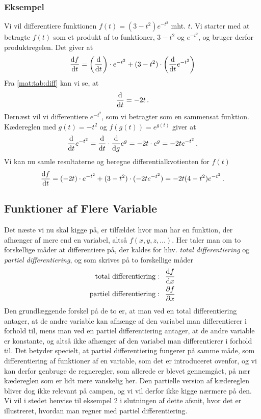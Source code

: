 \subsubsection{Eksempel}
Vi vil differentiere funktionen $f(t) = (3 - t^2) e^{-t^2}$
mht. $t$. Vi starter med at betragte $f(t)$ som et produkt af to
funktioner, $3-t^2$ og $e^{-t^2}$, og bruger derfor produktregelen. Det giver at
\begin{equation*}
    \dv{f}{t} = \left(\dv{}{t} (3-t^2)\right) \cdot e^{-t^2} + (3-t^2) \cdot \left(\dv{}{t} e^{-t^2}\right)
\end{equation*}
Fra \cref{mat:tab:diff} kan vi se, at
\begin{equation*}
    \dv{}{t} (3-t^2) = -2t \, .
\end{equation*}
Dernæst vil vi differentiere $e^{-t^2}$, som vi betragter som en
sammensat funktion. Kædereglen med $g(t) = -t^2$ og $f(g(t)) = e^{g(t)}$
giver at
\begin{equation*}
    \dv{}{t} e^{-t^2} = \dv{}{t} (-t^2) \cdot \dv{}{g} e^g
    = -2t \cdot e^g
    = -2t e^{-t^2} \, .
\end{equation*}
Vi kan nu samle resultaterne og beregne differentialkvotienten for $f(t)$
\begin{equation*}
    \dv{f}{t} = (-2t) \cdot e^{-t^2} + (3-t^2) \cdot (-2t e^{-t^2}) = -2t(4 - t^2) e^{-t^2} \, .
\end{equation*}

\subsection{Funktioner af Flere Variable}
Det næste vi nu skal kigge på, er tilfældet hvor man har en funktion, der afhænger af mere end en variabel, altså $f(x,y,z,\ldots)$. Her taler man om to forskellige måder at differentiere på, der kaldes for hhv. \emph{total differentiering} og \emph{partiel differentiering}, og som skrives på to forskellige måder
\begin{align*}
    \text{total differentiering}&: \enspace \dv{f}{x} \\ \text{partiel differentiering}&: \enspace \pdv{f}{x}
\end{align*} 
Den grundlæggende forskel på de to er, at man ved en total differentiering antager, at de andre variable kan afhænge af den variabel man differentierer i forhold til, mens man ved en partiel differentiering antager, at de andre variable er konstante, og altså ikke afhænger af den variabel man differentierer i forhold til. Det betyder specielt, at partiel differentiering fungerer på samme måde, som differentiering af funktioner af en variable, som det er introduceret ovenfor, og vi kan derfor genbruge de regneregler, som allerede er blevet gennemgået, på nær kædereglen som er lidt mere vanskelig her. Den partielle version af kædereglen bliver dog ikke relevant på campen, og vi vil derfor ikke kigge nærmere på den. Vi vil i stedet henvise til eksempel 2 i slutningen af dette afsnit, hvor det er illustreret, hvordan man regner med partiel differentiering.\\

